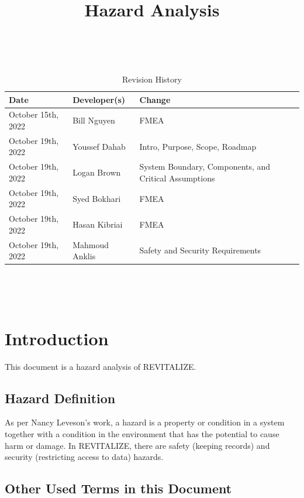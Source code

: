 \documentclass{article}
\title{Hazard Analysis\\\progname}
\author{\authname}
\date{}
\begin{document}
\maketitle
\thispagestyle{empty}

~\newpage


\begin{table}[hp]
	\caption{Revision History} \label{TblRevisionHistory}
	\begin{tabularx}{\textwidth}{llX}
		\toprule
		\textbf{Date} & \textbf{Developer(s)} & \textbf{Change}\\
		\midrule
		October 15th, 2022 & Bill Nguyen & FMEA \\
		October 19th, 2022 & Youssef Dahab & Intro, Purpose, Scope, Roadmap \\
		October 19th, 2022 & Logan Brown & System Boundary, Components, and Critical Assumptions\\
		October 19th, 2022 & Syed Bokhari & FMEA\\
		October 19th, 2022 & Hasan Kibriai & FMEA\\
		October 19th, 2022 & Mahmoud Anklis & Safety and Security Requirements\\
		\bottomrule
	\end{tabularx}
\end{table}

~\newpage

\tableofcontents

\listoffigures


~\newpage


\section{Introduction}
This document is a hazard analysis of REVITALIZE.

\subsection{Hazard Definition}
As per Nancy Leveson's work, a hazard is a property or condition in a system together with a condition in the environment that has the potential to cause harm or damage. In REVITALIZE, there are safety (keeping records) and security (restricting access to data) hazards.

\subsection{Other Used Terms in this Document}
\end{document}
